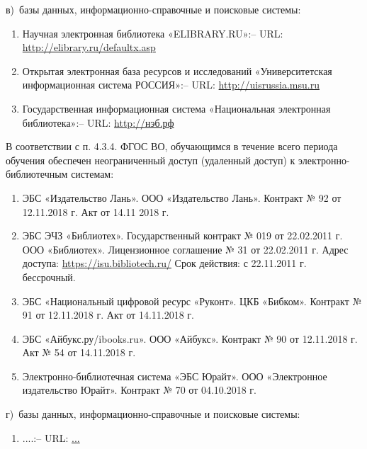 \documentclass[12pt]{scrartcl}
\newcommand{\rdf}[2]{#2}
\newenvironment{rdfctx}[1]{}{}
\begin{document}
\noindent в)\ базы данных, информационно-справочные и поисковые системы:
\begin{rdfctx}{\rdfsetctx{list}{syll wpdd:itemList !wpdd:EReferenceList !wpdd:ItemList}} %
\begin{enumerate}
  \item \rdf{list ^schema:member !wpdd:ListItem !wpdd:EReference}{Научная электронная библиотека «ELIBRARY.RU»\;:\;[сайт] -- URL: \url{http://elibrary.ru/defaultx.asp}}
  \item \rdf{list ^schema:member !wpdd:ListItem !wpdd:EReference}{Открытая электронная база ресурсов и исследований «Университетская информационная система РОССИЯ»\;:\;[сайт] -- URL: \url{http://uisrussia.msu.ru}}
  \item \rdf{list ^schema:member !wpdd:ListItem !wpdd:EReference}{Государственная информационная система «Национальная электронная библиотека»\;:\;[сайт] -- URL: \url{http://нэб.рф}}
\end{enumerate}
\end{rdfctx}
  В соответствии с п. 4.3.4. ФГОС ВО, обучающимся в течение всего периода обучения обеспечен неограниченный доступ (удаленный доступ) к электронно-библиотечным системам:
\begin{rdfctx}{\rdfsetctx{list}{syll wpdd:itemList !wpdd:EContractList !wpdd:ItemList}}
  \begin{enumerate}
  \item \rdf{list ^schema:member !wpdd:ListItem !wpdd:EReference}{ЭБС «Издательство Лань». ООО «Издательство Лань». Контракт № 92 от 12.11.2018 г. Акт от 14.11 2018 г.}
  \item \rdf{list ^schema:member !wpdd:ListItem !wpdd:EReference}{ЭБС ЭЧЗ «Библиотех». Государственный контракт № 019 от 22.02.2011 г. ООО «Библиотех». Лицензионное соглашение № 31 от 22.02.2011 г. Адрес доступа: \url{https://isu.bibliotech.ru/} Срок действия: с 22.11.2011 г. бессрочный.}
  \item \rdf{list ^schema:member !wpdd:ListItem !wpdd:EReference}{ЭБС «Национальный цифровой ресурс «Руконт». ЦКБ «Бибком». Контракт № 91 от 12.11.2018 г. Акт от 14.11.2018 г.}
  \item \rdf{list ^schema:member !wpdd:ListItem !wpdd:EReference}{ЭБС «Айбукс.ру/ibooks.ru». ООО «Айбукс». Контракт № 90 от 12.11.2018 г. Акт № 54 от 14.11.2018 г.}
  \item \rdf{list ^schema:member !wpdd:ListItem !wpdd:EReference rdfs:label}{Электронно-библиотечная система «ЭБС Юрайт». ООО «Электронное издательство Юрайт». Контракт № 70 от 04.10.2018 г.}
  \end{enumerate}
\end{rdfctx}
\noindent г)\ базы данных, информационно-справочные и поисковые системы:
\begin{rdfctx}{\rdfsetctx{list}{syll wpdd:itemList !wpdd:InternetResources !wpdd:ItemList}}
  \begin{enumerate}
  \item \rdf{list ^schema:member !wpdd:ListItem !wpdd:InternetResource}{....\;:\;[сайт] -- URL: \url{...}} %
  \end{enumerate}
\end{rdfctx}
\end{document}
